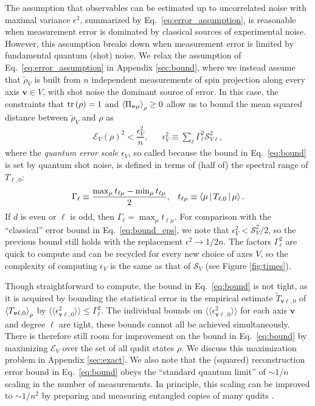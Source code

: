 \documentclass[notitlepage,twocolumn]{revtex4-2}
\newcommand{\f}[2]{\dfrac{#1}{#2}} %
\newcommand{\p}[1]{\left(#1\right)} %
\newcommand{\bk}{\Braket} %
\renewcommand{\v}{\bm} %
\newcommand{\bbk}[1]{\langle\!\langle #1 \rangle\!\rangle}
\newcommand{\E}{\mathcal{E}}
\renewcommand{\S}{\mathcal{S}}
\begin{document}
The assumption that observables can be estimated up to uncorrelated noise with maximal variance $\epsilon^2$, summarized by Eq.~\eqref{eq:error_assumption}, is reasonable when measurement error is dominated by classical sources of experimental noise.
However, this assumption breaks down when measurement error is limited by fundamental quantum (shot) noise.
We relax the assumption of Eq.~\eqref{eq:error_assumption} in Appendix \ref{sec:bound}, where we instead assume that $\tilde\rho_V$ is built from $n$ independent measurements of spin projection along every axis $\v v\in V$, with shot noise the dominant source of error.
In this case, the constraints that $\tr\p\rho=1$ and $\bk{\Pi_{\v v\mu}}_\rho\ge0$ allow us to bound the mean squared distance between $\tilde\rho_V$ and $\rho$ as
\begin{align}
  \E_V\p{\rho}^2 < \f{\epsilon_V^2}{n},
  &&
  \epsilon_V^2 \equiv \sum_\ell \Gamma_\ell^2 \S_{V\ell}^2,
  \label{eq:bound}
\end{align}
where the {\it quantum error scale} $\epsilon_V$, so called because the bound in Eq.~\eqref{eq:bound} is set by quantum shot noise, is defined in terms of (half of) the spectral range of $T_{\ell,0}$:
\begin{align}
  \Gamma_\ell \equiv \f{\max_\mu t_{\ell\mu} - \min_\mu t_{\ell\mu}}{2},
  &&
  t_{\ell\mu} \equiv \bk{\mu|T_{\ell,0}|\mu}.
\end{align}
If $d$ is even or $\ell$ is odd, then $\Gamma_\ell=\max_\mu t_{\ell\mu}$.
For comparison with the ``classical'' error bound in Eq.~\eqref{eq:bound_eps}, we note that $\epsilon_V^2<\S_V^2/2$, so the previous bound still holds with the replacement $\epsilon^2\to1/2n$.
The factors $\Gamma_\ell^2$ are quick to compute and can be recycled for every new choice of axes $V$, so the complexity of computing $\epsilon_V$ is the same as that of $\S_V$ (see Figure \ref{fig:times}).

Though straightforward to compute, the bound in Eq.~\eqref{eq:bound} is not tight, as it is acquired by bounding the statistical error in the empirical estimate $\tilde T_{\v v\ell,0}$ of $\bk{T_{\v v\ell,0}}_\rho$ by $\bbk{\epsilon_{\v v\ell,0}^2}\le\Gamma_\ell^2$.
The individual bounds on $\bbk{\epsilon_{\v v\ell,0}^2}$ for each axis $\v v$ and degree $\ell$ are tight, these bounds cannot all be achieved simultaneously.
There is therefore still room for improvement on the bound in Eq.~\eqref{eq:bound} by maximizing $\E_V$ over the set of all qudit states $\rho$.
We discuss this maximization problem in Appendix \ref{sec:exact}.
We also note that the (squared) reconstruction error bound in Eq.~\eqref{eq:bound} obeys the ``standard quantum limit'' of $\sim1/n$ scaling in the number of measurements.
In principle, this scaling can be improved to $\sim1/n^2$ by preparing and measuring entangled copies of many qudits \cite{giovannetti2006quantum}.
\end{document}
